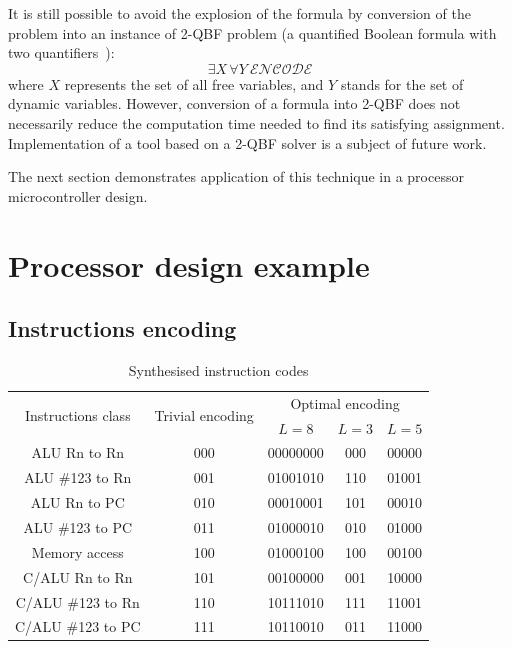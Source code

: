It is still possible to avoid the explosion of the formula by conversion
of the problem into an instance of 2-QBF problem (a quantified Boolean
formula with two quantifiers~\cite{2004_ranjan_qbf}):
\[
\exists X\,\forall Y\ \mathcal{ENCODE}
\]
where $X$ represents the set of all free variables, and $Y$ stands
for the set of dynamic variables. However, conversion of a formula
into 2-QBF does not necessarily reduce the computation time needed
to find its satisfying assignment. Implementation of a tool based
on a 2-QBF solver is a subject of future work.

The next section demonstrates application of this technique in a processor
microcontroller design.


\section{Processor design example\label{sec-processor}}

%



\subsection{Instructions encoding}

\begin{table}[t]
\centering

\begin{tabular}{|c||c|c|c|c|}
\hline 
\multirow{2}{*}{Instructions class} & 
\multirow{2}{*}{Trivial encoding} & 
\multicolumn{3}{c|}{ Optimal encoding} \tabularnewline
\cline{3-5}
& & $L=8$ & {$L=3$} & {$L=5$} \tabularnewline
\hline 
\hline 
{ ALU Rn to Rn} & { 000} & { 00000000} & { 000} & { 00000}\tabularnewline
\hline 
{ ALU \#123 to Rn} & { 001} & { 01001010} & { 110} & { 01001}\tabularnewline
\hline 
{ ALU Rn to PC} & { 010} & { 00010001} & { 101} & { 00010}\tabularnewline
\hline 
{ ALU \#123 to PC} & { 011} & { 01000010} & { 010} & { 01000}\tabularnewline
\hline 
{ Memory access} & { 100} & { 01000100} & { 100} & { 00100}\tabularnewline
\hline 
{ C/ALU Rn to Rn} & { 101} & { 00100000} & { 001} & { 10000}\tabularnewline
\hline 
{ C/ALU \#123 to Rn} & { 110} & { 10111010} & { 111} & { 11001}\tabularnewline
\hline 
{ C/ALU \#123 to PC} & { 111} & { 10110010} & { 011} & { 11000}\tabularnewline
\hline 
\end{tabular}

\caption{Synthesised instruction codes\label{tab:Synthesised-instruction-codes}}
\end{table}

